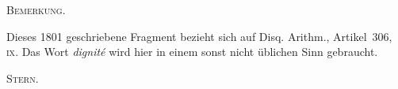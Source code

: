 \par\bigskip
{}
\begin{center}\textsc{Bemerkung.}\end{center}
\begingroup\small
Dieses 1801 geschriebene Fragment bezieht sich auf Disq. Arithm., Artikel~306, \textsc{ix}. Das Wort \emph{dignité} wird hier in einem sonst nicht üblichen Sinn gebraucht.
\begin{flushright}\textsc{Stern}.\end{flushright}
\endgroup
{}
